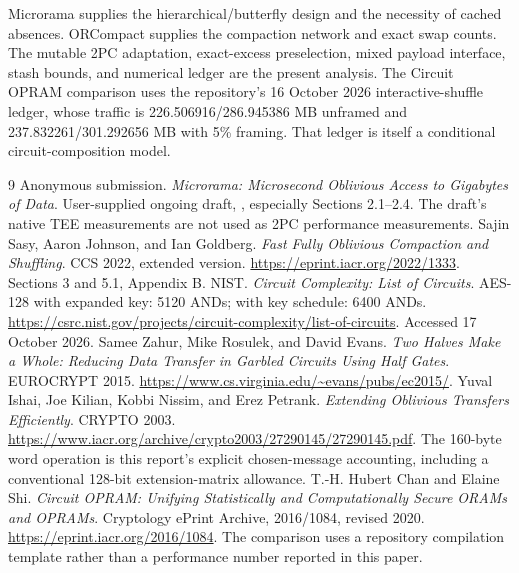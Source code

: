 \documentclass[11pt]{article}
\begin{document}
Microrama supplies the hierarchical/butterfly design and the necessity of
cached absences. ORCompact supplies the compaction network and exact swap
counts. The mutable 2PC adaptation, exact-excess preselection, mixed
payload interface, stash bounds, and numerical ledger are the present
analysis. The Circuit OPRAM comparison uses the repository's 16 October
2026 interactive-shuffle ledger, whose traffic is 226.506916/286.945386 MB
unframed and 237.832261/301.292656 MB with 5\% framing. That ledger is
itself a conditional circuit-composition model.

\begin{thebibliography}{9}
 Anonymous submission.
\emph{Microrama: Microsecond Oblivious Access to Gigabytes of Data}.
User-supplied ongoing draft, , especially Sections 2.1--2.4.
The draft's native TEE measurements are not used as 2PC performance measurements.
 Sajin Sasy, Aaron Johnson, and Ian Goldberg.
\emph{Fast Fully Oblivious Compaction and Shuffling}. CCS 2022, extended version.
\url{https://eprint.iacr.org/2022/1333}. Sections 3 and 5.1, Appendix B.
 NIST. \emph{Circuit Complexity: List of Circuits}.
AES-128 with expanded key: 5120 ANDs; with key schedule: 6400 ANDs.
\url{https://csrc.nist.gov/projects/circuit-complexity/list-of-circuits}.
Accessed 17 October 2026.
 Samee Zahur, Mike Rosulek, and David Evans.
\emph{Two Halves Make a Whole: Reducing Data Transfer in Garbled Circuits
Using Half Gates}. EUROCRYPT 2015.
\url{https://www.cs.virginia.edu/~evans/pubs/ec2015/}.
 Yuval Ishai, Joe Kilian, Kobbi Nissim, and Erez Petrank.
\emph{Extending Oblivious Transfers Efficiently}. CRYPTO 2003.
\url{https://www.iacr.org/archive/crypto2003/27290145/27290145.pdf}.
The 160-byte word operation is this report's explicit chosen-message
accounting, including a conventional 128-bit extension-matrix allowance.
 T.-H. Hubert Chan and Elaine Shi.
\emph{Circuit OPRAM: Unifying Statistically and Computationally Secure
ORAMs and OPRAMs}. Cryptology ePrint Archive, 2016/1084, revised 2020.
\url{https://eprint.iacr.org/2016/1084}.
The comparison uses a repository compilation template rather than a
performance number reported in this paper.
\end{thebibliography}
\end{document}
